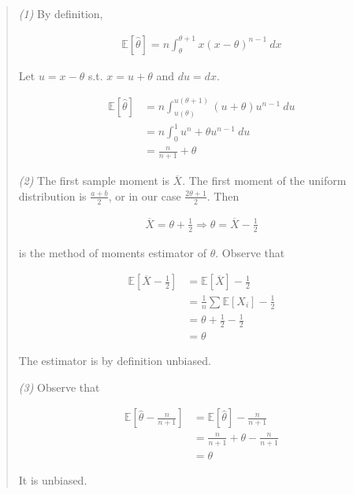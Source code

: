 \documentclass[a4paper, 12pt]{article}
\begin{document}
\small
\begin{quote}

\textit{(1)} By definition, 

\begin{align*}
    \mathbb{E}\left[ \hat{\theta} \right] = n\int_{\theta}^{\theta+1} x(x -
    \theta)^{n-1} ~ dx
\end{align*}

Let $u = x - \theta$ s.t. $x = u + \theta$ and $du = dx$. 

\begin{align*}
    \mathbb{E}\left[ \hat{\theta} \right] &= n\int_{u(\theta)}^{u(\theta+1)} (u +
    \theta)u^{n-1} ~ du \\ 
                                          &= n\int_{0}^{1} u^{n} + \theta u^{n-1}
                                          ~ du \\ 
                                          &= \frac{n}{n+1} + \theta
\end{align*}

\textit{(2)} The first sample moment is $\overline{X}$. The first moment of the
uniform distribution is $\frac{a + b}{2}$, or in our case $\frac{2\theta +
1}{2}$. Then 

\begin{align*}
    \overline{X} = \theta + \frac{1}{2} \Rightarrow \theta = \overline{X} -
    \frac{1}{2}
\end{align*}

is the method of moments estimator of $\theta$. Observe that 

\begin{align*}
    \mathbb{E}\left[ \overline{X} - \frac{1}{2} \right] &= \mathbb{E}\left[
    \overline{X} \right] -\frac{1}{2} \\ 
                                                        &= \frac{1}{n}\sum \mathbb{E}
                                                        \left[ X_i \right]  -
                                                        \frac{1}{2} \\ 
                                                        &= \theta + \frac{1}{2}
                                                        - \frac{1}{2} \\ 
                                                        &= \theta
\end{align*}

The estimator is by definition unbiased. 

\textit{(3)} Observe that 

\begin{align*}
    \mathbb{E} \left[ \hat{\theta} - \frac{n}{n+1} \right] &= \mathbb{E}\left[
    \hat{\theta} \right]  - \frac{n}{n+1} \\ 
                                                           &= \frac{n}{n+1} +
                                                           \theta -
                                                           \frac{n}{n+1} \\ 
                                                           &= \theta
\end{align*}

It is unbiased.

\end{quote}
\end{document}
